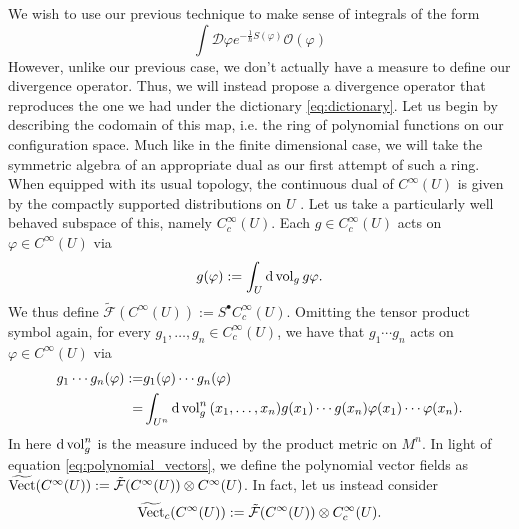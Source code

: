 We wish to use our previous technique to make sense of integrals of the form
\begin{equation}
\int\mathcal{D}\varphi e^{-\frac{1}{\hbar}S(\varphi)}\mathcal{O}(\varphi)
\end{equation}
However, unlike our previous case, we don't actually have a measure to define our divergence operator. Thus, we will instead propose a divergence operator that reproduces the one we had under the dictionary \eqref{eq:dictionary}. Let us begin by describing the codomain of this map, i.e. the ring of polynomial functions on our configuration space. Much like in the finite dimensional case, we will take the symmetric algebra of an appropriate dual as our first attempt of such a ring. When equipped with its usual topology, the continuous dual of $C^\infty(U)$ is given by the compactly supported distributions on $U$ \cite[see][Theorem 2.3.1]{Hormander2003}. Let us take a particularly well behaved subspace of this, namely $C^\infty_c(U)$. Each $g\in C^\infty_c(U)$ acts on $\varphi\in C^\infty(U)$ via
\begin{equation}
g(\varphi):=\int_U\dd{\operatorname{vol}_g}g\varphi.
\end{equation}
We thus define $\tilde{\mathcal{F}}(C^\infty(U)):=S^\bullet C^\infty_c(U)$. Omitting the tensor product symbol again, for every $g_1,\dots,g_n\in C^\infty_c(U)$, we have that $g_1\cdots g_n$ acts on $\varphi\in C^\infty(U)$ via
\begin{equation}\label{eq:simple_polynomials}
\begin{aligned}
g_1\cdots g_n(\varphi):=&g_1(\varphi)\cdots g_n(\varphi)\\
=&\int_{U^n}\dd{\operatorname{vol}_g^n}(x_1,\dots, x_n)g(x_1)\cdots g(x_n)\varphi(x_1)\cdots\varphi(x_n).
\end{aligned}
\end{equation}
In here $\dd{\operatorname{vol}_g^n}$ is the measure induced by the product metric on $M^n$. In light of equation \eqref{eq:polynomial_vectors}, we define the polynomial vector fields as $\widetilde{\operatorname{Vect}}(C^\infty(U)):=\tilde{\mathcal{F}}(C^\infty(U))\otimes C^\infty(U)$. In fact, let us instead consider 
\begin{equation}
\widetilde{\operatorname{Vect}}_c(C^\infty(U)):=\tilde{\mathcal{F}}(C^\infty(U))\otimes C^\infty_c(U).
\end{equation}

